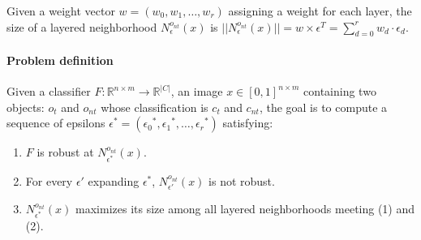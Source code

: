 
Given a weight vector $w = (w_0, w_1, \ldots, w_r)$ assigning a weight for each layer, the size of a layered neighborhood ${N^{o_{nt}}_\epsilon}(x)$ is $||{N^{o_{nt}}_\epsilon}(x)|| = w \times \epsilon^T = \sum_{d=0}^{r}{w_d \cdot \epsilon_d}$.\\

\paragraph{Problem definition} Given a classifier $F: \mathbb{R}^{n \times m} \rightarrow {\mathbb{R}}^{|C|}$, an image $x \in [0,1]^{n \times m}$ containing two objects: $o_t$ and $o_{nt}$ whose classification is $c_t$ and $c_{nt}$, 
the goal is to compute a sequence of epsilons $\epsilon^* = ({\epsilon_0}^*, {\epsilon_1}^*, \ldots, {\epsilon_r}^*)$ satisfying:

\begin{enumerate}
    \item $F$ is robust at ${N^{o_{nt}}_{\epsilon^*}}(x)$.
    \item For every $\epsilon'$ expanding $\epsilon^*$, ${N^{o_{nt}}_{\epsilon'}}(x)$ is not robust.
    \item ${N^{o_{nt}}_{\epsilon^*}}(x)$ maximizes its size among all layered neighborhoods meeting (1) and (2).
\end{enumerate}

